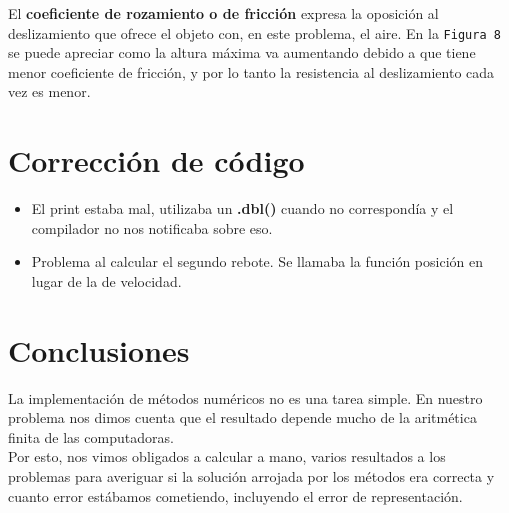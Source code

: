 \documentclass[a4paper]{article}
\begin{document}
El \textbf{coeficiente de rozamiento o de fricción} expresa la oposición al deslizamiento que ofrece el objeto con, en este problema, el aire. En la \texttt{Figura 8} se puede apreciar como la altura máxima va aumentando debido a que tiene menor coeficiente de fricción, y por lo tanto la resistencia al deslizamiento cada vez es menor.



\newpage


\newpage

\section{Corrección de código}
\begin{itemize}
	\item El print estaba mal, utilizaba un \textbf{.dbl()} cuando no correspondía y el compilador no nos notificaba sobre eso.
	\item Problema al calcular el segundo rebote. Se llamaba la función posición en lugar de la de velocidad.
\end{itemize}


\section{Conclusiones}
La implementación de métodos numéricos no es una tarea simple. En nuestro problema nos dimos cuenta que el resultado depende mucho de la aritmética finita de las computadoras. \\ \hspace{1em}
Por esto, nos vimos obligados a calcular a mano, varios resultados a los problemas para averiguar si la solución arrojada por los métodos era correcta y cuanto error estábamos cometiendo, incluyendo el error de representación.  \\ \vspace{1em}
\end{document}
